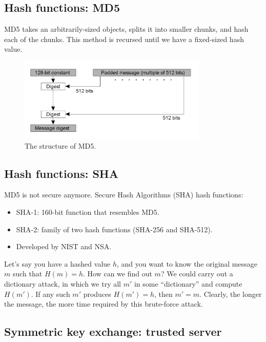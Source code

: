 \documentclass[twoside]{article}
\begin{document}
\subsection{Hash functions: MD5}

MD5 takes an arbitrarily-sized objects, splits it into smaller chunks, and hash each of the chunks. This method is recursed until we have a fixed-sized hash value.

\begin{figure}[h]
\centering
\includegraphics[width=0.8\textwidth]{md5.png}
\caption{The structure of MD5.}
\end{figure}

\subsection{Hash functions: SHA}

MD5 is not secure anymore. Secure Hash Algorithms (SHA) hash functions:

\begin{itemize}
\item SHA-1: 160-bit function that resembles MD5.
\item SHA-2: family of two hash functions (SHA-256 and SHA-512).
\item Developed by NIST and NSA.
\end{itemize}

Let's say you have a hashed value $h$, and you want to know the original message $m$ such that $H(m) = h$. How can we find out $m$? We could carry out a dictionary attack, in which we try all $m'$ in some ``dictionary'' and compute $H(m')$. If any such $m'$ produces $H(m') = h$, then $m' = m$. Clearly, the longer the message, the more time required by this brute-force attack.

\subsection{Symmetric key exchange: trusted server}
\end{document}
